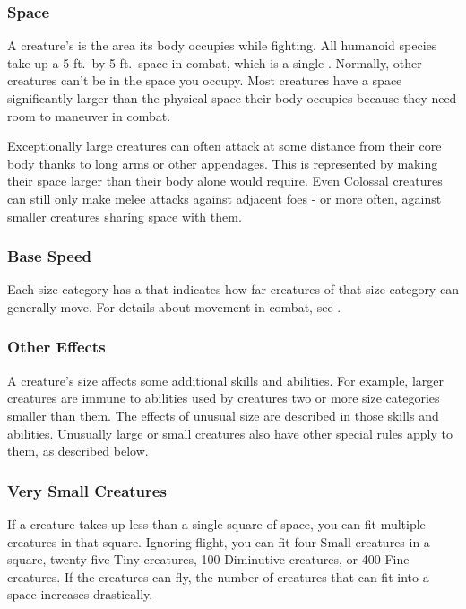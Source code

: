     \subsubsection{Space}\label{Space}
      A creature's  is the area its body occupies while fighting.
      All humanoid species take up a 5-ft.\ by 5-ft.\ space in combat, which is a single .
      Normally, other creatures can't be in the space you occupy.
      Most creatures have a space significantly larger than the physical space their body occupies because they need room to maneuver in combat.

      Exceptionally large creatures can often attack at some distance from their core body thanks to long arms or other appendages.
      This is represented by making their space larger than their body alone would require.
      Even Colossal creatures can still only make melee attacks against adjacent foes - or more often, against smaller creatures sharing space with them.

    \subsubsection{Base Speed}\label{Base Speed}
      Each size category has a  that indicates how far creatures of that size category can generally move.
      For details about movement in combat, see .

    \subsubsection{Other Effects}
      A creature's size affects some additional skills and abilities.
      For example, larger creatures are immune to \atSizeBased abilities used by creatures two or more size categories smaller than them.
      The effects of unusual size are described in those skills and abilities.
      Unusually large or small creatures also have other special rules apply to them, as described below.

    \subsubsection{Very Small Creatures}
       If a creature takes up less than a single square of space, you can fit multiple creatures in that square.
      Ignoring flight, you can fit four Small creatures in a square, twenty-five Tiny creatures, 100 Diminutive creatures, or 400 Fine creatures.
      If the creatures can fly, the number of creatures that can fit into a space increases drastically.

